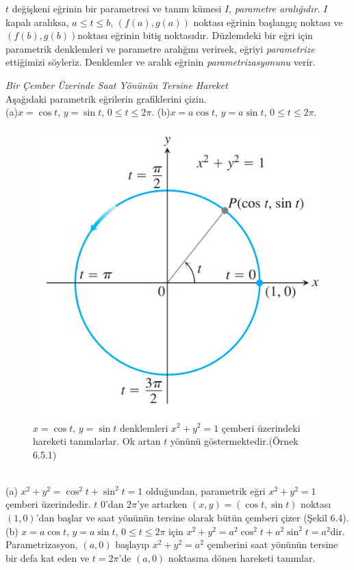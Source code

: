 $t$ değişkeni eğrinin bir parametresi ve tanım kümesi $I$, \textit{parametre aralığıdır}. $I$ kapalı aralıksa, $a \leq t \leq b$, $(f(a),g(a))$ noktası eğrinin başlangıç noktası ve $(f(b),g(b))$noktası eğrinin bitiş noktasıdır. Düzlemdeki bir eğri için parametrik denklemleri ve parametre aralığını verirsek, eğriyi \textit{parametrize} ettiğimizi söyleriz. Denklemler ve aralık eğrinin \textit{parametrizasyonunu} verir.
\begin{ornek}\textit{Bir Çember Üzerinde Saat Yönünün Tersine Hareket}\\
Aşağıdaki parametrik eğrilerin grafiklerini çizin.\\
(a)$x= \cos t$,		$y= \sin t$,		$0 \leq t \leq 2\pi$.
(b)$x= a\cos t$,		$y= a\sin t$,		$0 \leq t \leq 2\pi$.
\end{ornek}
\begin{figure}[H]
	\centering
	\includegraphics[width=0.4\linewidth]{parametrik2.png}
	\caption{$x=\cos t$, $y= \sin t$ denklemleri $ x^2+y^2=1$ çemberi üzerindeki hareketi tanımlarlar. Ok artan $t$ yönünü göstermektedir.(Örnek 6.5.1)}
	\label{fig:ornekresim}
\end{figure}
\begin{cozum}\\
(a) $x^2+y^2 = \cos ^2 t+ \sin	^2 t = 1$ olduğundan, parametrik eğri $x^2+y^2 =1$ çemberi üzerindedir. $t$ 0'dan $2\pi$'ye artarken $(x,y)=(\cos t, \sin t)$ noktası $(1,0)$'dan başlar ve saat yönünün tersine olarak bütün çemberi çizer (Şekil 6.4).\\
(b) $x= a \cos t$, $y= a \sin t$, $0 \leq t \leq 2\pi$ için $x^2+y^2 =a^2 \cos ^2 t+ a^2 \sin ^2 t=a^2$dir. Parametrizasyon, $(a,0)$ başlayıp $x^2+y^2=a^2$ çemberini saat yönünün tersine bir defa kat eden ve $t=2\pi$'de $(a,0)$ noktasına dönen hareketi tanımlar.
\end{cozum}

